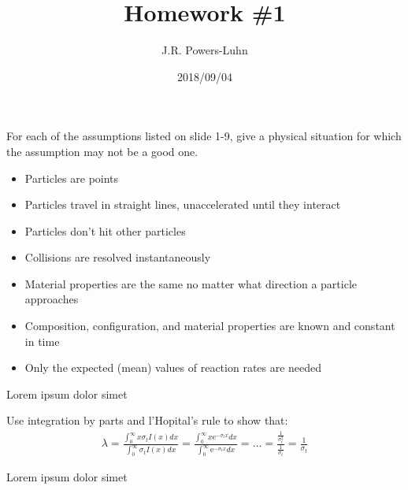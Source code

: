 \documentclass{hw}
\author{J.R. Powers-Luhn}
\date{2018/09/04}
\title{Homework \#1}
\begin{document}
\problem{}
    For each of the assumptions listed on slide 1-9, give a physical situation for which the assumption may not be a good one.
    \begin{itemize}
        \item Particles are points
        \item Particles travel in straight lines, unaccelerated until they interact
        \item Particles don't hit other particles
        \item Collisions are resolved instantaneously
        \item Material properties are the same no matter what direction a particle approaches
        \item Composition, configuration, and material properties are known and constant in time
        \item Only the expected (mean) values of reaction rates are needed
    \end{itemize}

\solution
    Lorem ipsum dolor simet

\problem{}
    Use integration by parts and l'Hopital's rule to show that:
    \begin{align*}
        \lambda = \frac{\int_0^\infty x \sigma_t I(x) dx}{\int_0^\infty \sigma_t I(x) dx} = \frac{\int_0^\infty x \mathrm{e}^{-\sigma_t x} dx }{\int_0^\infty \mathrm{e}^{-\sigma_t x} dx} = \ldots = \frac{\frac{1}{\sigma_t^2}}{\frac{1}{\sigma_t}} = \frac{1}{\sigma_t} 
    \end{align*}

\solution
    Lorem ipsum dolor simet
\end{document}
